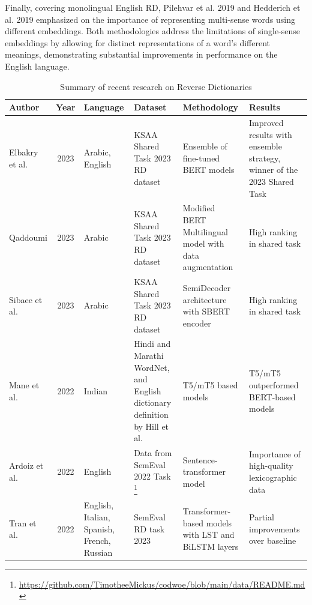 \documentclass[12.5pt]{article}
\begin{document}
Finally, covering monolingual English RD, Pilehvar et al. 2019 \cite{Pilehvar2019} and Hedderich et al. 2019 \cite{Hedderich2019} emphasized on the importance of representing multi-sense words using different embeddings. Both methodologies address the limitations of single-sense embeddings by allowing for distinct representations of a word's different meanings, demonstrating substantial improvements in performance on the English language.

\begin{table}
    \centering
    \caption{Summary of recent research on Reverse Dictionaries}
    \small
    \renewcommand{\arraystretch}{1.75}
    \begin{tabularx}{\textwidth}{|l|c|L{0.4}|L{1}|L{1.4}|L{1.2}|}
        \hline
        \textbf{Author} & \textbf{Year} &  \textbf{Language} & \textbf{Dataset} & \textbf{Methodology} & \textbf{Results} \\
        \hline
        Elbakry et al. \cite{Albakry2023} & 2023 & Arabic, English & KSAA Shared Task 2023 RD dataset & Ensemble of fine-tuned BERT models & Improved results with ensemble strategy, winner of the 2023 Shared Task \\
        \hline
        Qaddoumi \cite{Qaddoumi2023} & 2023 & Arabic & KSAA Shared Task 2023 RD dataset & Modified BERT Multilingual model with data augmentation & High ranking in shared task \\
        \hline
        Sibaee et al. \cite{Sibaee2023} & 2023 & Arabic & KSAA Shared Task 2023 RD dataset & SemiDecoder architecture with SBERT encoder & High ranking in shared task \\
        \hline
        Mane et al. \cite{Mane2022} & 2022 & Indian & Hindi and Marathi WordNet, and English dictionary deﬁnition by Hill et al. \cite{Hill2016} & T5/mT5 based models & T5/mT5 outperformed BERT-based models \\
        \hline
        Ardoiz et al. \cite{Ardoiz2022} & 2022 & English & Data from SemEval 2022 Task \footnote{\href{https://github.com/TimotheeMickus/codwoe/blob/main/data/README.md}{https://github.com/TimotheeMickus/codwoe/blob/main/data/README.md}} & Sentence-transformer model & Importance of high-quality lexicographic data \\
        \hline
        Tran et al.\cite{Tran2022} & 2022 & English, Italian, Spanish, French, Russian & SemEval RD task 2023 & Transformer-based models with LST and BiLSTM layers & Partial improvements over baseline \\
        \hline

\end{tabularx}
\end{table}
\end{document}

